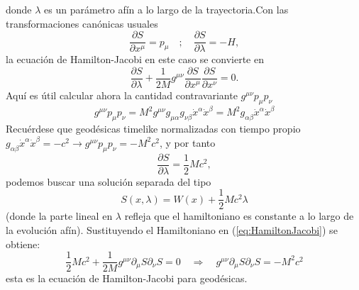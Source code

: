 donde $\lambda$ es un parámetro afín a lo largo de la trayectoria.Con las transformaciones canónicas usuales
\begin{equation}
    \frac{\partial S}{\partial x^\mu} = p_\mu \quad ; \quad \frac{\partial S}{\partial \lambda} = -H,
\end{equation}
la ecuación de Hamilton-Jacobi en este caso se convierte en
\begin{equation}
\frac{\partial S}{\partial \lambda}+\frac{1}{2M} g^{\mu \nu} \frac{\partial S}{\partial x^\mu}  \frac{\partial S}{\partial x^\nu} =0.
\end{equation}
Aquí es útil calcular ahora la cantidad contravariante $g^{\mu \nu} p_\mu p_\nu$ 
\begin{equation}
g^{\mu \nu} p_\mu p_\nu=M^2 g^{\mu \nu} g_{\mu \alpha} g_{\nu \beta} \dot{x}^\alpha \dot{x}^\beta=M^2 g_{\alpha \beta} \dot{x}^\alpha \dot{x}^\beta
\end{equation}
Recuérdese que geodésicas timelike normalizadas con tiempo propio $g_{\alpha \beta} \dot{x}^\alpha \dot{x}^\beta=-c^2 \rightarrow g^{\mu \nu} p_\mu p_\nu=-M^2 c^2$, y por tanto
\begin{equation}
\frac{\partial S}{\partial \lambda}=\frac{1}{2} M c^2,
\end{equation}
podemos buscar una solución separada del tipo
\begin{equation}
S(x, \lambda)=W(x)+\frac{1}{2} Mc^2 \lambda
\end{equation}
(donde la parte lineal en $\lambda$ refleja que el hamiltoniano es constante a lo largo de la evolución afín). 
Sustituyendo el Hamiltoniano en (\ref{eq:HamiltonJacobi}) se obtiene:
\begin{equation}
    \frac{1}{2} Mc^2+\frac{1}{2 M} g^{\mu \nu} \partial_\mu S \partial_\nu S=0 \quad \Longrightarrow \quad g^{\mu \nu} \partial_\mu S \partial_\nu S=-M^2 c^2
    \label{eq:geodesicHamiltonJacobi}
\end{equation}
esta es la ecuación de Hamilton-Jacobi para geodésicas.
